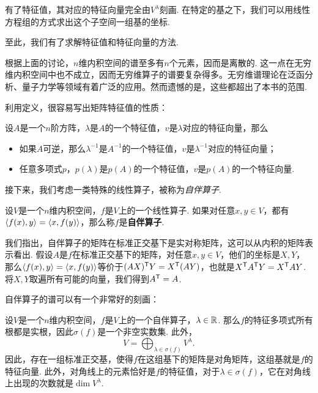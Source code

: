 有了特征值，其对应的特征向量完全由$V^\lambda$刻画. 在特定的基之下，我们可以用线性方程组的方式求出这个子空间一组基的坐标. 

至此，我们有了求解特征值和特征向量的方法. 

\begin{remark}
根据上面的讨论，$n$维内积空间的谱至多有$n$个元素，因而是离散的. 这一点在无穷维内积空间中也不成立，因而无穷维算子的谱要复杂得多。无穷维谱理论在泛函分析、量子力学等领域有着广泛的应用。然而遗憾的是，这些都超出了本书的范围.
\end{remark}

利用定义，很容易写出矩阵特征值的性质：
\begin{proposition}
设$A$是一个$n$阶方阵，$\lambda$是$A$的一个特征值，$v$是$\lambda$对应的特征向量，那么
\begin{itemize}
    \item 如果$A$可逆，那么$\lambda^{-1}$是$A^{-1}$的一个特征值，$v$是$\lambda^{-1}$对应的特征向量；
    \item 任意多项式$p$，$p(\lambda)$是$p(A)$的一个特征值，$v$是$p(A)$的一个特征向量. 
\end{itemize}
\end{proposition}

接下来，我们考虑一类特殊的线性算子，被称为\emph{自伴算子}.

\begin{definition}[自伴算子]
设$V$是一个$n$维内积空间，$f$是$V$上的一个线性算子. 如果对任意$x,y\in V$，都有$\left\langle{f(x)},{y}\right\rangle=\left\langle{x},{f(y)}\right\rangle$，那么称$f$是\textbf{自伴算子}. 
\end{definition}

我们指出，自伴算子的矩阵在标准正交基下是实对称矩阵，这可以从内积的矩阵表示看出. 假设$A$是$f$在标准正交基下的矩阵，对任意$x,y\in V$，他们的坐标是$X,Y$，那么$\left\langle{f(x)},{y}\right\rangle=\left\langle{x},{f(y)}\right\rangle$等价于$(AX)^{\mathsf{T}} Y=X^{\mathsf{T}}(AY)$，也就是$X^{\mathsf{T}} A^{\mathsf{T}} Y=X^{\mathsf{T}} AY$. 将$X,Y$取遍所有可能的向量，我们得到$A^{\mathsf{T}}=A$.

自伴算子的谱可以有一个非常好的刻画：
\begin{theorem}\label{thm:symmetric-operator-spectrum}
    设$V$是一个$n$维内积空间，$f$是$V$上的一个自伴算子，$\lambda\in\mathbb{R}$. 那么$f$的特征多项式所有根都是实根，因此$\sigma(f)$是一个非空实数集. 此外，
    \[V=\bigoplus_{\lambda\in\sigma(f)}V^\lambda.\]
    因此，存在一组标准正交基，使得$f$在这组基下的矩阵是对角矩阵，这组基就是$f$的特征向量. 此外，对角线上的元素恰好是$f$的特征值，对于$\lambda\in\sigma(f)$，它在对角线上出现的次数就是$\dim V^\lambda$. 
\end{theorem}

